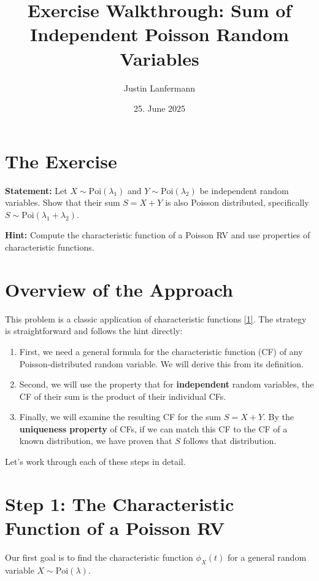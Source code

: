 \documentclass[11pt,a4paper]{article}
\title{Exercise Walkthrough: Sum of Independent Poisson Random Variables}
\author{Justin Lanfermann}
\date{25. June 2025}
\begin{document}
\maketitle

\section*{The Exercise}
\noindent\textbf{Statement:} Let $X \sim \text{Poi}(\lambda_1)$ and $Y \sim \text{Poi}(\lambda_2)$ be independent random variables. Show that their sum $S = X + Y$ is also Poisson distributed, specifically $S \sim \text{Poi}(\lambda_1 + \lambda_2)$.

\vspace{1em}
\noindent\textbf{Hint:} Compute the characteristic function of a Poisson RV and use properties of characteristic functions.

\section*{Overview of the Approach}
This problem is a classic application of characteristic functions \hyperlink{note1}{[1]}. The strategy is straightforward and follows the hint directly:
\begin{enumerate}
    \item First, we need a general formula for the characteristic function (CF) of any Poisson-distributed random variable. We will derive this from its definition.
    \item Second, we will use the property that for \textbf{independent} random variables, the CF of their sum is the product of their individual CFs.
    \item Finally, we will examine the resulting CF for the sum $S = X+Y$. By the \textbf{uniqueness property} of CFs, if we can match this CF to the CF of a known distribution, we have proven that $S$ follows that distribution.
\end{enumerate}

Let's work through each of these steps in detail.

\section{Step 1: The Characteristic Function of a Poisson RV}
Our first goal is to find the characteristic function $\phi_X(t)$ for a general random variable $X \sim \text{Poi}(\lambda)$.
\end{document}
